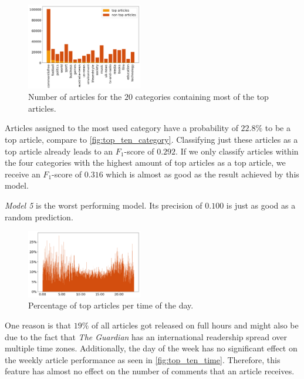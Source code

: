 \begin{figure}
	\includegraphics[width=0.45\textwidth]{fig/top_ten_category.png}
	\caption{\textmd{Number of articles for the $20$ categories containing most of the top articles.}}
	\label{fig:top_ten_category}
\end{figure}

Articles assigned to the most used category have a probability of $22.8\%$ to be a top article, compare to \autoref{fig:top_ten_category}. Classifying just these articles as a top article already leads to an $F_1$-score of $0.292$. 
If we only classify articles within the four categories with the highest amount of top articles as a top article, we receive an $F_1$-score of $0.316$ which is almost as good as the result achieved by this model.

\textit{Model 5} is the worst performing model. Its precision of $0.100$ is just as good as a random prediction.

\begin{figure}
	\includegraphics[width=0.45\textwidth]{fig/top_ten_time.png}
	\caption{\textmd{Percentage of top articles per time of the day.}}
	\label{fig:top_ten_time}
\end{figure}

One reason is that $19\%$ of all articles got released on full hours and might also be due to the fact that \textit{The Guardian} has an international readership spread over multiple time zones. Additionally, the day of the week has no significant effect on the weekly article performance as seen in \autoref{fig:top_ten_time}. Therefore, this feature has almost no effect on the number of comments that an article receives. 

